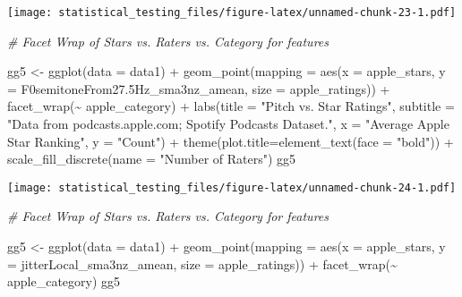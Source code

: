 \documentclass[
]{article}
\newenvironment{Shaded}{\begin{snugshade}}{\end{snugshade}}
\newcommand{\AttributeTok}[1]{\textcolor[rgb]{0.77,0.63,0.00}{#1}}
\newcommand{\CommentTok}[1]{\textcolor[rgb]{0.56,0.35,0.01}{\textit{#1}}}
\newcommand{\FloatTok}[1]{\textcolor[rgb]{0.00,0.00,0.81}{#1}}
\newcommand{\FunctionTok}[1]{\textcolor[rgb]{0.00,0.00,0.00}{#1}}
\newcommand{\NormalTok}[1]{#1}
\newcommand{\OtherTok}[1]{\textcolor[rgb]{0.56,0.35,0.01}{#1}}
\newcommand{\SpecialCharTok}[1]{\textcolor[rgb]{0.00,0.00,0.00}{#1}}
\newcommand{\StringTok}[1]{\textcolor[rgb]{0.31,0.60,0.02}{#1}}
\begin{document}
\texttt{[image: statistical\_testing\_files/figure-latex/unnamed-chunk-23-1.pdf]}

\begin{Shaded}
\begin{Highlighting}[]
\CommentTok{\# Facet Wrap of Stars vs. Raters vs. Category for features}

\NormalTok{gg5 }\OtherTok{\textless{}{-}} \FunctionTok{ggplot}\NormalTok{(}\AttributeTok{data =}\NormalTok{ data1) }\SpecialCharTok{+}
  \FunctionTok{geom\_point}\NormalTok{(}\AttributeTok{mapping =} \FunctionTok{aes}\NormalTok{(}\AttributeTok{x =}\NormalTok{ apple\_stars, }\AttributeTok{y =}\NormalTok{ F0semitoneFrom27}\FloatTok{.5}\NormalTok{Hz\_sma3nz\_amean, }\AttributeTok{size =}\NormalTok{ apple\_ratings)) }\SpecialCharTok{+}
  \FunctionTok{facet\_wrap}\NormalTok{(}\SpecialCharTok{\textasciitilde{}}\NormalTok{ apple\_category) }\SpecialCharTok{+}
  \FunctionTok{labs}\NormalTok{(}\AttributeTok{title =} \StringTok{"Pitch vs. Star Ratings"}\NormalTok{,}
       \AttributeTok{subtitle =} \StringTok{"Data from podcasts.apple.com; Spotify Podcasts Dataset."}\NormalTok{,}
       \AttributeTok{x =} \StringTok{"Average Apple Star Ranking"}\NormalTok{,}
       \AttributeTok{y =} \StringTok{"Count"}\NormalTok{) }\SpecialCharTok{+}
  \FunctionTok{theme}\NormalTok{(}\AttributeTok{plot.title=}\FunctionTok{element\_text}\NormalTok{(}\AttributeTok{face =} \StringTok{"bold"}\NormalTok{)) }\SpecialCharTok{+}
   \FunctionTok{scale\_fill\_discrete}\NormalTok{(}\AttributeTok{name =} \StringTok{"Number of Raters"}\NormalTok{)}
\NormalTok{gg5}
\end{Highlighting}
\end{Shaded}

\texttt{[image: statistical\_testing\_files/figure-latex/unnamed-chunk-24-1.pdf]}

\begin{Shaded}
\begin{Highlighting}[]
\CommentTok{\# Facet Wrap of Stars vs. Raters vs. Category for features}

\NormalTok{gg5 }\OtherTok{\textless{}{-}} \FunctionTok{ggplot}\NormalTok{(}\AttributeTok{data =}\NormalTok{ data1) }\SpecialCharTok{+}
  \FunctionTok{geom\_point}\NormalTok{(}\AttributeTok{mapping =} \FunctionTok{aes}\NormalTok{(}\AttributeTok{x =}\NormalTok{ apple\_stars, }\AttributeTok{y =}\NormalTok{ jitterLocal\_sma3nz\_amean, }\AttributeTok{size =}\NormalTok{ apple\_ratings)) }\SpecialCharTok{+}
  \FunctionTok{facet\_wrap}\NormalTok{(}\SpecialCharTok{\textasciitilde{}}\NormalTok{ apple\_category)}
\NormalTok{gg5}
\end{Highlighting}
\end{Shaded}
\end{document}
